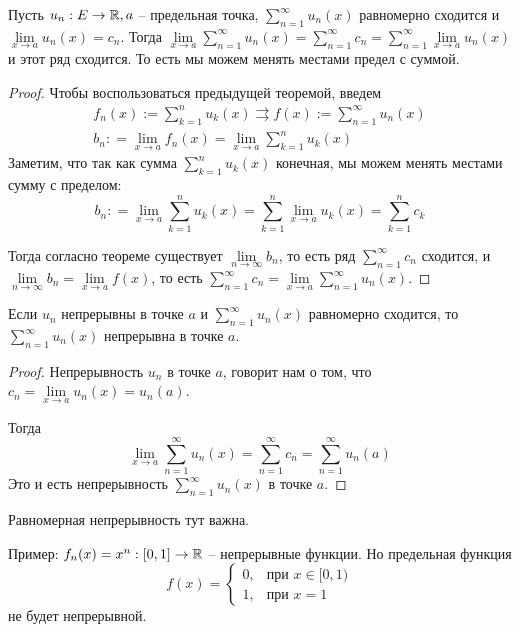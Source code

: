  \begin{theorem}
     Пусть $u_n: E \to \mathbb{R}, a$ -- предельная точка, $\sum\limits_{n=1}^\infty u_n(x)$ равномерно сходится и $\lim\limits_{x \to a} u_n(x) = c_n$.
     Тогда $\lim\limits_{x \to a} \sum\limits_{n=1}^\infty u_n(x) = \sum\limits_{n=1}^\infty c_n = \sum\limits_{n=1}^\infty \lim\limits_{x \to a} u_n(x)$ и этот ряд сходится.
     То есть мы можем менять местами предел с суммой.
 \end{theorem}
 \begin{proof}
    Чтобы воспользоваться предыдущей теоремой, введем 
    \begin{gather*}
        f_n(x) := \sum\limits_{k=1}^n u_k(x) \rightrightarrows f(x) := \sum_{n=1}^\infty u_n(x) \\
        b_n: = \lim_{x \to a} f_n(x) = \lim_{x \to a} \sum_{k=1}^n u_k(x)
    \end{gather*}
    \quad Заметим, что так как сумма $\sum\limits_{k=1}^n u_k(x)$ конечная, мы можем менять местами сумму с пределом:
    \[ b_n: = \lim_{x \to a} \sum_{k=1}^n u_k(x) = \sum_{k=1}^n \lim_{x \to a} u_k(x) = \sum_{k=1}^n c_k  \]
    
    \quad Тогда согласно теореме существует $\lim\limits_{n \to \infty} b_n$, то есть ряд $\sum\limits_{n = 1}^\infty c_n$ сходится, и $\lim\limits_{n \to \infty} b_n = \lim\limits_{x \to a} f(x)$, то есть $\sum\limits_{n = 1}^\infty c_n = \lim\limits_{x \to a} \sum\limits_{n = 1}^\infty u_n(x)$.
 \end{proof}
 \begin{follow}
     Если $u_n$ непрерывны в точке $a$ и $\sum\limits_{n = 1}^\infty u_n(x)$ равномерно сходится, то $\sum\limits_{n = 1}^\infty u_n(x)$ непрерывна в точке $a$.
 \end{follow}
\begin{proof}
    Непрерывность $u_n$ в точке $a$, говорит нам о том, что $c_n = \lim\limits_{x \to a} u_n(x) = u_n(a)$.

    \quad Тогда \[ \lim\limits_{x \to a} \sum\limits_{n=1}^\infty u_n(x) = \sum\limits_{n=1}^\infty c_n = \sum\limits_{n=1}^\infty u_n(a)   \]
    \quad Это и есть непрерывность $\sum\limits_{n = 1}^\infty u_n(x)$ в точке $a$.
\end{proof}

\begin{notice}
    Равномерная непрерывность тут важна. 

    Пример: $f_n(x) = x^n : [0, 1] \to \mathbb{R}$ -- непрерывные функции. Но предельная функция \[ f(x) = \begin{cases}
        0, & \text{при $x \in [0, 1)$} \\
        1, & \text{при $x = 1$}
    \end{cases} \]
    не будет непрерывной.
 \end{notice}

